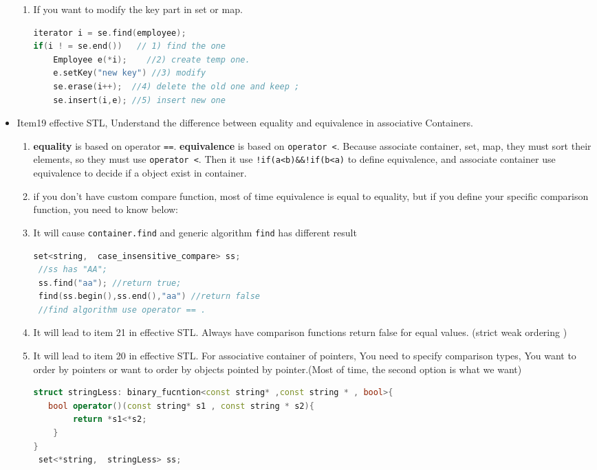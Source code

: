 \documentclass[a4paper,11pt,twoside]{book}
\begin{document}
\begin{itemize}
\begin{enumerate}
\item If you want to modify the key part in set or map.
\begin{lstlisting}[frame=single, language=c++]
iterator i = se.find(employee); 
if(i ! = se.end())   // 1) find the one
	Employee e(*i);    //2) create temp one.
	e.setKey("new key") //3) modify
	se.erase(i++);  //4) delete the old one and keep ;
	se.insert(i,e); //5) insert new one
\end{lstlisting}
 \end{enumerate}

\item Item19 effective STL, Understand the difference between equality and equivalence in associative Containers.
  \begin{enumerate}
  \item \textbf{equality} is based on operator \texttt{==}. \textbf{equivalence} is based on \texttt{operator <}. Because associate container, set, map, they must sort their elements, so they must use \texttt{operator <}. Then it use \texttt{!if(a<b)\&\&!if(b<a)} to define equivalence, and associate container use equivalence to decide if a object exist in container.
  
  \item if you don't have custom compare function, most of time equivalence is equal to equality, but if you define your specific comparison function, you need to know below:
  
  \item It will cause \texttt{container.find} and generic algorithm \texttt{find} has different result
\begin{lstlisting}[frame=single, language=c++]
 set<string,  case_insensitive_compare> ss;
 //ss has "AA";
 ss.find("aa"); //return true;
 find(ss.begin(),ss.end(),"aa") //return false
 //find algorithm use operator == .
\end{lstlisting}

  \item It will lead to item 21 in effective STL. Always have comparison functions return false for equal values. (strict weak ordering )
  
  \item It will lead to item 20 in effective STL. For associative container of pointers, You need to specify comparison types, You want to order by pointers or want to order by objects pointed by pointer.(Most of time, the second option is what we want)
\begin{lstlisting}[frame=single, language=c++]
struct stringLess: binary_fucntion<const string* ,const string * , bool>{
   bool operator()(const string* s1 , const string * s2){
        return *s1<*s2;
	}
}
 set<*string,  stringLess> ss;
\end{lstlisting}

  \end{enumerate}



\end{itemize}
\end{document}
